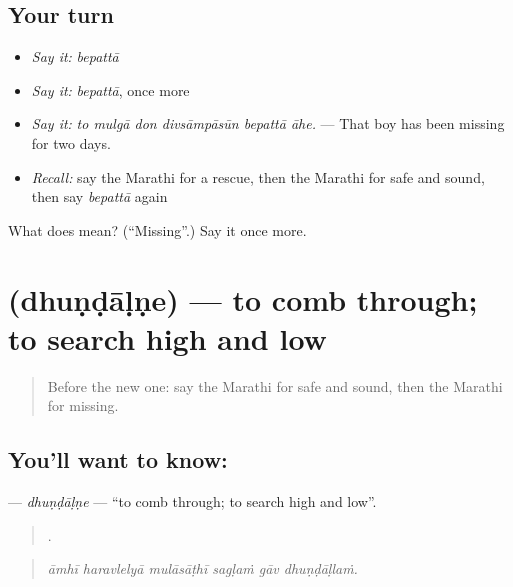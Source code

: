 \subsection*{Your turn}
\begin{itemize}
\raggedright
  \item \emph{Say it:} \emph{bepattā}
  \item \emph{Say it:} \emph{bepattā}, once more
  \item \emph{Say it:} \emph{to mulgā don divsāmpāsūn bepattā āhe.} — That boy has been missing for two days.
  \item \emph{Recall:} say the Marathi for a rescue, then the Marathi for safe and sound, then say \emph{bepattā} again
\end{itemize}

\begin{tcolorbox}[breakable,colback=teal!4,colframe=teal!35!black,title={Before you move on}]
What does  mean? (\textquotedblleft{}Missing\textquotedblright{}.) Say it once more.
\end{tcolorbox}
\section[\texorpdfstring{\mr{धुंडाळणे} (dhuṇḍāḷṇe)}{धुंडाळणे (dhuṇḍāḷṇe)}]{ (dhuṇḍāḷṇe) — to comb through; to search high and low}

\label{lesson:MR-C291-dhundalne}



\begin{quote}
Before the new one: say the Marathi for safe and sound, then the Marathi for missing.
\end{quote}

\subsection*{You'll want to know: }
\textbf{} — \emph{dhuṇḍāḷṇe} — \textquotedblleft{}to comb through; to search high and low\textquotedblright{}.

\begin{quote}
     .
\end{quote}

\begin{quote}
\emph{āmhī haravlelyā mulāsāṭhī sagḷaṁ gāv dhuṇḍāḷlaṁ.}
\end{quote}

